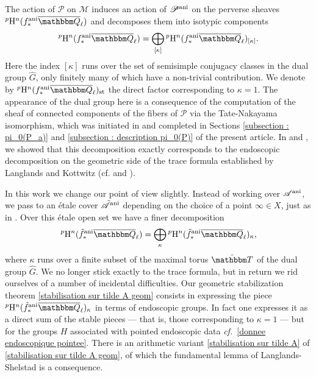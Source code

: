 \documentclass[12pt,english]{smfart}
\numberwithin{equation}{subsection}
\theoremstyle{remark}
\newcommand\calA{{\mathscr A}}
\newcommand\calP{{\mathscr P}}
\newcommand\calM{{\mathscr M}}
\newcommand\QQ{{\mathbbm Q}}
\newcommand\bbT{{\mathbbm T}}
\newcommand\rmH{{\rm H}}
\newcommand\cf{{\it cf.\ }}
\newcommand\ani{{\rm ani}}
\newcommand\Ql{{\overline\QQ_\ell}}
\begin{document}
The action of $\calP$ on $\calM$ induces an action of $\calP^\ani$ on the perverse sheaves ${}^p\rmH^n(f^\ani_*\Ql)$ and decomposes them into isotypic components
$${}^p\rmH^n(f^\ani_*\Ql)=\bigoplus_{[\kappa]}{}^p\rmH^n(f^\ani_*\Ql)_{[\kappa]}.$$
Here the index $[\kappa]$ runs over the set of semisimple conjugacy classes in the dual group $\hat G$, only finitely many of which have a non-trivial contribution. We denote by ${}^p\rmH^n(f^\ani_*\Ql)_{\rm st}$ the direct factor corresponding to $\kappa=1$. The appearance of the dual group here is a consequence of the computation of the sheaf of connected components of the fibers of $\calP$ via the Tate-Nakayama isomorphism, which was initiated in \cite[6]{N} and completed in Sections \ref{subsection : pi_0(P_a)} and \ref{subsection : description pi_0(P)} of the present article. In \cite{N} and \cite{N-ICM}, we showed that this decomposition exactly corresponds to the endoscopic decomposition on the geometric side of the trace formula established by Langlands and Kottwitz (cf. \cite{Langlands} and \cite{K-EST}).

In this work we change our point of view slightly. Instead of working over $\calA^\ani$, we pass to an \'etale cover $\tilde\calA^\ani$ depending on the choice of a point $\infty\in X$, just as in \cite{LN}. Over this \'etale open set we have a finer decomposition
$${}^p\rmH^n(\tilde f^\ani_*\Ql)=\bigoplus_{\kappa}{}^p\rmH^n(\tilde f^\ani_*\Ql)_\kappa,$$
where $\kappa$ runs over a finite subset of the maximal torus $\hat\bbT$ of the dual group $\hat G$. We no longer stick exactly to the trace formula, but in return we rid ourselves of a number of incidental difficulties. Our geometric stabilization theorem \ref{stabilisation sur tilde A geom} consists in expressing the piece ${}^p\rmH^n(\tilde f^\ani_*\Ql)_\kappa$ in terms of endoscopic groups. In fact one expresses it as a direct sum of the stable pieces --- that is, those corresponding to $\kappa=1$ --- but for the groups $H$ associated with pointed endoscopic data \cf \ref{donnee endoscopique pointee}. There is an arithmetic variant \ref{stabilisation sur tilde A} of \ref{stabilisation sur tilde A geom}, of which the fundamental lemma of Langlands-Shelstad is a consequence.
\end{document}
